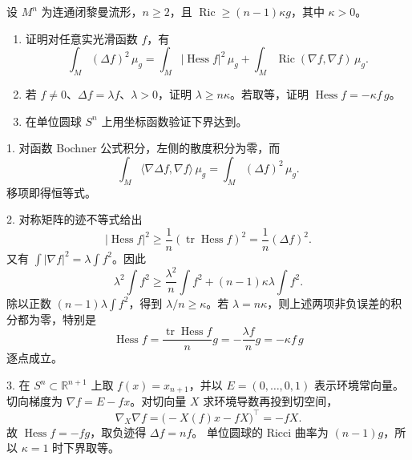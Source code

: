 \begin{exercise}\label{g3:ex:ricci-eigenvalue-bound}
	设 \(M^n\) 为连通闭黎曼流形，\(n\ge2\)，且
	\(\operatorname{Ric}\ge(n-1)\kappa g\)，其中 \(\kappa>0\)。
	\begin{enumerate}
		\item 证明对任意实光滑函数 \(f\)，有
		\[
			\int_M(\Delta f)^2\,\mu_g
			=\int_M|\operatorname{Hess}f|^2\,\mu_g
			 +\int_M\operatorname{Ric}(\nabla f,\nabla f)\,\mu_g.
		\]
		\item 若 \(f\ne0\)、\(\Delta f=\lambda f\)、\(\lambda>0\)，证明
		\(\lambda\ge n\kappa\)。若取等，证明
		\(\operatorname{Hess}f=-\kappa f\,g\)。
		\item 在单位圆球 \(S^n\) 上用坐标函数验证下界达到。
	\end{enumerate}
\end{exercise}
\begin{solution}
	1. 对函数 Bochner 公式积分，左侧的散度积分为零，而
	\[
		\int_M\langle\nabla\Delta f,\nabla f\rangle\,\mu_g
		=\int_M(\Delta f)^2\,\mu_g.
	\]
	移项即得恒等式。

	2. 对称矩阵的迹不等式给出
	\[
		|\operatorname{Hess}f|^2
		\ge\frac1n(\operatorname{tr}\operatorname{Hess}f)^2
		=\frac1n(\Delta f)^2.
	\]
	又有 \(\int|\nabla f|^2=\lambda\int f^2\)。因此
	\[
		\lambda^2\int f^2
		\ge\frac{\lambda^2}{n}\int f^2
		    +(n-1)\kappa\lambda\int f^2.
	\]
	除以正数 \((n-1)\lambda\int f^2\)，得到
	\(\lambda/n\ge\kappa\)。若 \(\lambda=n\kappa\)，则上述两项非负误差的积分都为零，特别是
	\[
		\operatorname{Hess}f
		=\frac{\operatorname{tr}\operatorname{Hess}f}{n}g
		=-\frac{\lambda f}{n}g=-\kappa f\,g
	\]
	逐点成立。

	3. 在 \(S^n\subset\mathbb R^{n+1}\) 上取 \(f(x)=x_{n+1}\)，并以
	\(E=(0,\ldots,0,1)\) 表示环境常向量。切向梯度为
	\(\nabla f=E-fx\)。对切向量 \(X\) 求环境导数再投到切空间，
	\[
		\nabla_X\nabla f
		=\bigl(-X(f)x-fX\bigr)^\top=-fX.
	\]
	故 \(\operatorname{Hess}f=-fg\)，取负迹得 \(\Delta f=nf\)。
	单位圆球的 Ricci 曲率为 \((n-1)g\)，所以 \(\kappa=1\) 时下界取等。
\end{solution}


